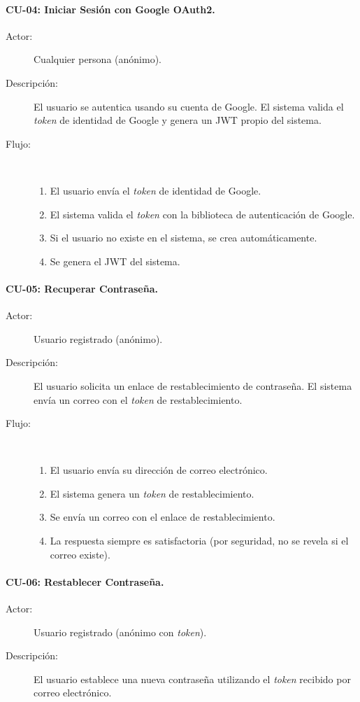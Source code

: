 \paragraph{CU-04: Iniciar Sesión con Google OAuth2.}
\begin{description}
    \item[Actor:] Cualquier persona (anónimo).
    \item[Descripción:] El usuario se autentica usando su cuenta de Google. El sistema valida el \textit{token} de identidad de Google y genera un JWT propio del sistema.
    \item[Flujo:]~
    \begin{enumerate}
        \item El usuario envía el \textit{token} de identidad de Google.
        \item El sistema valida el \textit{token} con la biblioteca de autenticación de Google.
        \item Si el usuario no existe en el sistema, se crea automáticamente.
        \item Se genera el JWT del sistema.
    \end{enumerate}
\end{description}

\paragraph{CU-05: Recuperar Contraseña.}
\begin{description}
    \item[Actor:] Usuario registrado (anónimo).
    \item[Descripción:] El usuario solicita un enlace de restablecimiento de contraseña. El sistema envía un correo con el \textit{token} de restablecimiento.
    \item[Flujo:]~
    \begin{enumerate}
        \item El usuario envía su dirección de correo electrónico.
        \item El sistema genera un \textit{token} de restablecimiento.
        \item Se envía un correo con el enlace de restablecimiento.
        \item La respuesta siempre es satisfactoria (por seguridad, no se revela si el correo existe).
    \end{enumerate}
\end{description}

\paragraph{CU-06: Restablecer Contraseña.}
\begin{description}
    \item[Actor:] Usuario registrado (anónimo con \textit{token}).
    \item[Descripción:] El usuario establece una nueva contraseña utilizando el \textit{token} recibido por correo electrónico.
\end{description}

